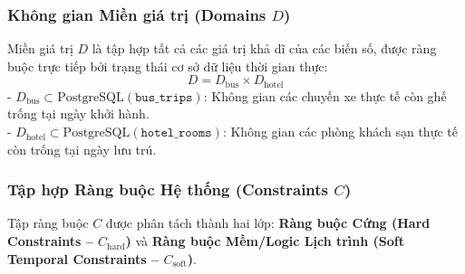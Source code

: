 \subsubsection{Không gian Miền giá trị (Domains $D$)}
Miền giá trị $D$ là tập hợp tất cả các giá trị khả dĩ của các biến số, được ràng buộc trực tiếp bởi trạng thái cơ sở dữ liệu thời gian thực:
\begin{equation}
D = D_{\text{bus}} \times D_{\text{hotel}}
\end{equation}
- $D_{\text{bus}} \subset \text{PostgreSQL}(\texttt{bus\_trips})$: Không gian các chuyến xe thực tế còn ghế trống tại ngày khởi hành. \\
- $D_{\text{hotel}} \subset \text{PostgreSQL}(\texttt{hotel\_rooms})$: Không gian các phòng khách sạn thực tế còn trống tại ngày lưu trú.

\subsubsection{Tập hợp Ràng buộc Hệ thống (Constraints $C$)}
Tập ràng buộc $C$ được phân tách thành hai lớp: \textbf{Ràng buộc Cứng (Hard Constraints -- $C_{\text{hard}}$)} và \textbf{Ràng buộc Mềm/Logic Lịch trình (Soft Temporal Constraints -- $C_{\text{soft}}$)}.

